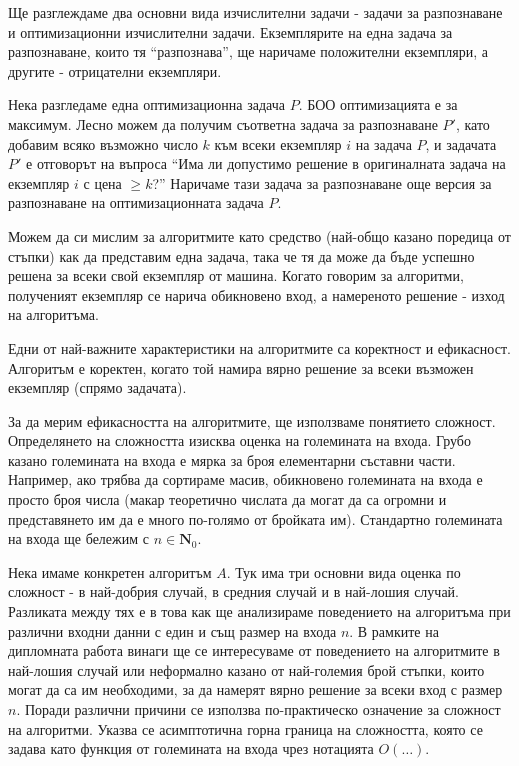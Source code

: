 \documentclass[12pt,twoside,a4paper]{article}
\begin{document}
	Ще разглеждаме два основни вида изчислителни задачи - задачи за разпознаване и оптимизационни изчислителни задачи. Екземплярите на една задача за разпознаване, които тя "`разпознава"', ще наричаме положителни екземпляри, а другите - отрицателни екземпляри.
	
	Нека разгледаме една оптимизационна задача $P$. БОО оптимизацията е за максимум. Лесно можем да получим съответна задача за разпознаване $P'$, като добавим всяко възможно число $k$ към всеки екземпляр $i$ на задача $P$, и задачата $P'$ е отговорът на въпроса "`Има ли допустимо решение в оригиналната задача на екземпляр $i$ с цена $\ge k$?"' Наричаме тази задача за разпознаване още версия за разпознаване на оптимизационната задача $P$. 
	
	Можем да си мислим за алгоритмите като средство (най-общо казано поредица от стъпки) как да представим една задача, така че тя да може да бъде успешно решена за всеки свой екземпляр от машина. Когато говорим за алгоритми, полученият екземпляр се нарича обикновено вход, а намереното решение - изход на алгоритъма.
	
	Едни от най-важните характеристики на алгоритмите са коректност и ефикасност. Алгоритъм е коректен, когато той намира вярно решение за всеки възможен екземпляр (спрямо задачата).
	
	За да мерим ефикасността на алгоритмите, ще използваме понятието сложност. Определянето на сложността изисква оценка на големината на входа. Грубо казано големината на входа е мярка за броя елементарни съставни части. Например, ако трябва да сортираме масив, обикновено големината на входа е просто броя числа (макар теоретично числата да могат да са огромни и представянето им да е много по-голямо от бройката им). Стандартно големината на входа ще бележим с $n \in \mathbf{N}_0$.
	
	Нека имаме конкретен алгоритъм $A$. Тук има три основни вида оценка по сложност - в най-добрия случай, в средния случай и в най-лошия случай. Разликата между тях е в това как ще анализираме поведението на алгоритъма при различни входни данни с един и същ размер на входа $n$. В рамките на дипломната работа винаги ще се интересуваме от поведението на алгоритмите в най-лошия случай или неформално казано от най-големия брой стъпки, които могат да са им необходими, за да намерят вярно решение за всеки вход с размер $n$. Поради различни причини се използва по-практическо означение за сложност на алгоритми. Указва се асимптотична горна граница на сложността, която се задава като функция от големината на входа чрез нотацията $O(\dots)$.
	
\end{document}
